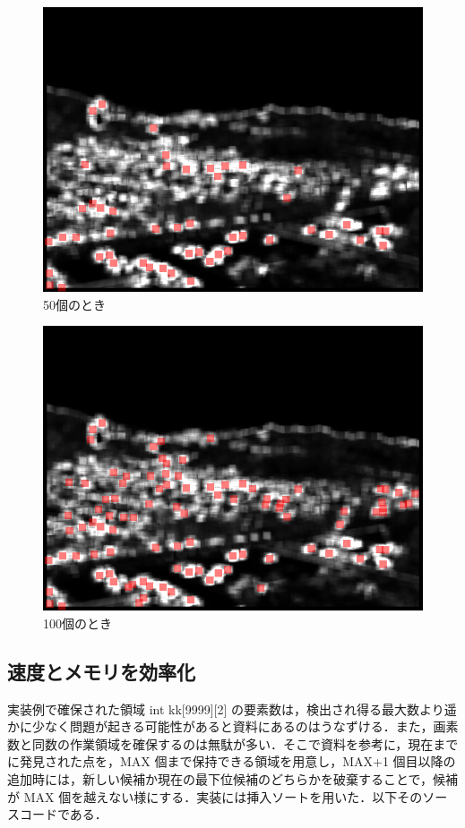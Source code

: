 \documentclass[11pt]{jarticle}
\begin{document}
\begin{figure}[ht]
  \centering
  \includegraphics[scale=.3]{5-1.jpg}
  \caption{50個のとき}
  \label{5-1.jpg}
\end{figure}

\begin{figure}[ht]
  \centering
  \includegraphics[scale=.3]{5-2.jpg}
  \caption{100個のとき}
  \label{5-2.jpg}
\end{figure}

\subsection{速度とメモリを効率化}
実装例で確保された領域 int kk[9999][2] の要素数は，検出され得る最大数より遥かに少なく問題が起きる可能性があると資料にあるのはうなずける．また，画素数と同数の作業領域を確保するのは無駄が多い．そこで資料を参考に，現在までに発見された点を，MAX 個まで保持できる領域を用意し，MAX+1 個目以降の追加時には，新しい候補か現在の最下位候補のどちらかを破棄することで，候補が MAX 個を越えない様にする．実装には挿入ソートを用いた．以下そのソースコードである．
\end{document}
